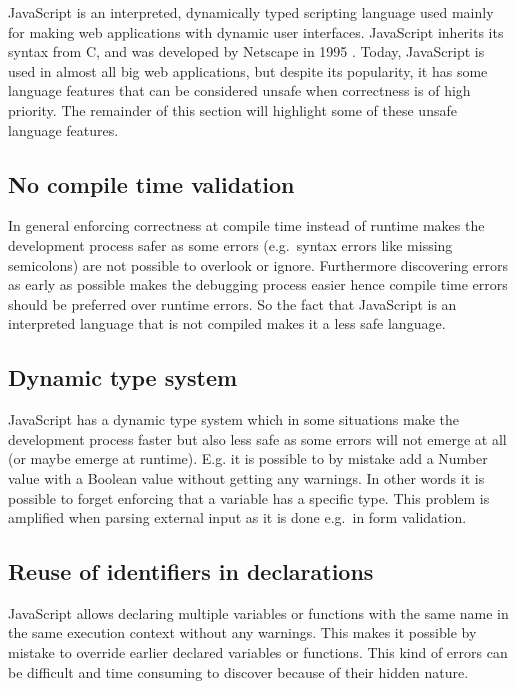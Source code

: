 	JavaScript is an interpreted, dynamically typed scripting language used mainly for making web applications with dynamic user interfaces. JavaScript inherits its syntax from C, and was developed by Netscape in 1995 \cite{bib:wiki_javascript}. Today, JavaScript is used in almost all big web applications, but despite its popularity, it has some language features that can be considered unsafe when correctness is of high priority. The remainder of this section will highlight some of these unsafe language features.

	\subsection{No compile time validation} %
	\label{sub:no_compile_time_validation}
		In general enforcing correctness at compile time instead of runtime makes the development process safer as some errors (e.g.\ syntax errors like missing semicolons) are not possible to overlook or ignore. Furthermore discovering errors as early as possible makes the debugging process easier hence compile time errors should be preferred over runtime errors. So the fact that JavaScript is an interpreted language that is not compiled makes it a less safe language.

	\subsection{Dynamic type system} %
	\label{sub:dynamic_type_system}
		JavaScript has a dynamic type system which in some situations make the development process faster but also less safe as some errors will not emerge at all (or maybe emerge at runtime). E.g. it is possible to by mistake add a Number value with a Boolean value without getting any warnings. In other words it is possible to forget enforcing that a variable has a specific type. This problem is amplified when parsing external input as it is done e.g.\ in form validation.

	\subsection{Reuse of identifiers in declarations} %
	\label{sec:reuse_of_identifiers_in_declarations}
		JavaScript allows declaring multiple variables or functions with the same name in the same execution context without any warnings. This makes it possible by mistake to override earlier declared variables or functions. This kind of errors can be difficult and time consuming to discover because of their hidden nature.

